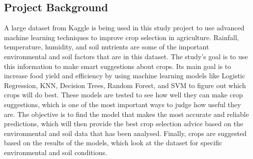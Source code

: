 \subsection{Project Background}
A large dataset from Kaggle is being used in this study project to use advanced machine learning techniques to improve crop selection in agriculture. Rainfall, temperature, humidity, and soil nutrients are some of the important environmental and soil factors that are in this dataset. The study's goal is to use this information to make smart suggestions about crops. Its main goal is to increase food yield and efficiency by using machine learning models like Logistic Regression, KNN, Decision Trees, Random Forest, and SVM to figure out which crops will do best. These models are tested to see how well they can make crop suggestions, which is one of the most important ways to judge how useful they are. The objective is to find the model that makes the most accurate and reliable predictions, which will then provide the best crop selection advice based on the environmental and soil data that has been analysed. Finally, crops are suggested based on the results of the models, which look at the dataset for specific environmental and soil conditions.




